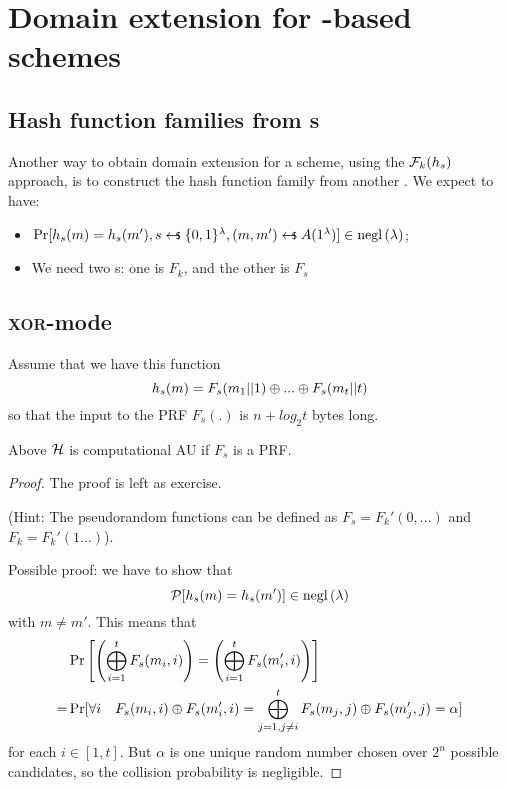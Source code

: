 
\section{Domain extension for \prf-based \mac{} schemes}

\subsection{Hash function families from \prf{}s}

Another way to obtain domain extension for a \mac{} scheme, using the $\mathcal{F}_k(h_s)$ approach, is to construct the hash function family from another \prf{}. We expect to have:
\begin{itemize}
    \item $\Pr[h_s(m) = h_s(m'), s \pickUAR \{0, 1\}^\lambda, (m, m') \pickUAR A(1^\lambda)] \in \negl{\lambda}$;
    \item We need two \prf{}s: one is $F_{k}$, and the other is $F_{s}$
\end{itemize}

\subsection{\textsc{xor}-mode}

Assume that we have this function
\[
    h_{s}(m)=F_{s}(m_{1}||1) \oplus ... \oplus F_{s}(m_{t}||t)
\]
so that the input to the PRF $F_{s}(.)$ is $n + log_{2} t$ bytes long.

\begin{lemma}
    Above $\mathcal{H}$ is computational AU if $F_s$ is a PRF.
\end{lemma}

\begin{proof} The proof is left as exercise.

    (Hint: The pseudorandom functions can be defined as $F_s = F_k'(0, \dots)$ and $F_k = F_k'(1 \dots)$).
    
    Possible proof: we have to show that
    \[
        \mathcal{P} [ h_{s}(m)=h_{s}(m') ] \in \mathrm{negl}\left({\lambda}\right)   
    \]
    with $m \neq m'$. This means that 
    \begin{align*}
        &\Pr\left[\left(\bigoplus_{i = 1}^{t} F_s(m_i, i)\right) = \left(\bigoplus_{i = 1}^{t} F_s(m_i', i)\right)\right] \\
        = &\Pr[\forall i \quad F_s(m_i, i) \oplus F_s(m'_i, i) = \bigoplus_{j = 1, j \neq i}^{t} F_s(m_j, j) \oplus F_s(m'_j, j) = \alpha]
    \end{align*}
    for each $i \in [1,t]$. But $\alpha$ is one unique random number chosen over $2^{n}$ possible candidates, so the collision probability is negligible.
    
\end{proof}

